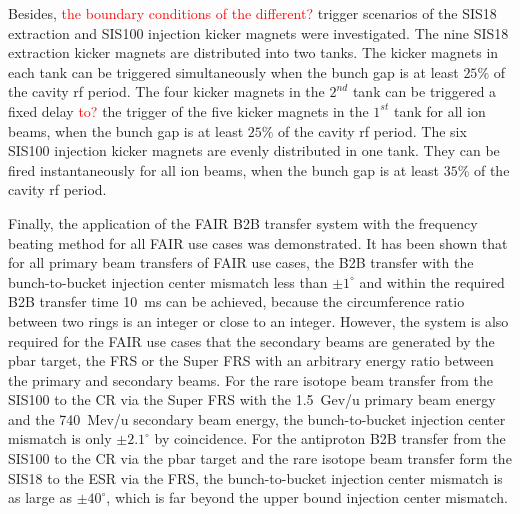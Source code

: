 Besides, \textcolor{red}{the boundary conditions of the different?} trigger scenarios of the SIS18 extraction and SIS100 injection kicker magnets were investigated. The nine SIS18 extraction kicker magnets are distributed into two tanks. The kicker magnets in each tank can be triggered simultaneously when the bunch gap is at least $25\%$ of the cavity rf period. The four kicker magnets in the $2^{nd}$ tank can be triggered a fixed delay \textcolor{red}{to?} the trigger of the five kicker magnets in the $1^{st}$ tank for all ion beams, when the bunch gap is at least $25\%$ of the cavity rf period. The six SIS100 injection kicker magnets are evenly distributed in one tank. They can be fired instantaneously for all ion beams, when the bunch gap is at least $35\%$ of the cavity rf period.

Finally, the application of the FAIR B2B transfer system with the frequency beating method for all FAIR use cases was demonstrated. It has been shown that for all primary beam transfers of FAIR use cases, the B2B transfer with the bunch-to-bucket injection center mismatch less than $\pm1^\circ$ and within the required B2B transfer time \SI{10}{\ms} can be achieved, because the circumference ratio between two rings is an integer or close to an integer. However, the system is also required for the FAIR use cases that the secondary beams are generated by the pbar target, the FRS or the Super FRS with an arbitrary energy ratio between the primary and secondary beams. For the rare isotope beam transfer from the SIS100 to the CR via the Super FRS with the \SI{1.5}{Gev/u} primary beam energy and the \SI{740}{Mev/u} secondary beam energy, the bunch-to-bucket injection center mismatch is only $\pm2.1^\circ$ by coincidence. For the antiproton B2B transfer from the SIS100 to the CR via the pbar target and the rare isotope beam transfer form the SIS18 to the ESR via the FRS, the bunch-to-bucket injection center mismatch is as large as $\pm40^\circ$, which is far beyond the upper bound injection center mismatch.

